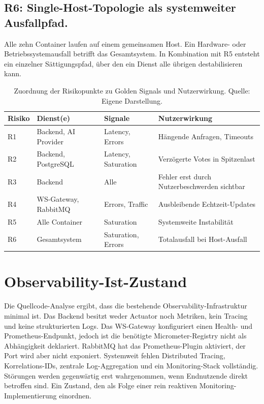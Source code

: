 \subsection{R6: Single-Host-Topologie als systemweiter Ausfallpfad.}
Alle zehn Container laufen auf einem gemeinsamen Host. Ein Hardware- oder Betriebssystemausfall betrifft das Gesamtsystem. In Kombination mit R5 entsteht ein einzelner Sättigungspfad, über den ein Dienst alle übrigen destabilisieren kann.

\begin{table}[ht]
\centering
\caption[Zuordnung der Risikopunkte zu Golden Signals und Nutzerwirkung.]{Zuordnung der Risikopunkte zu Golden Signals und Nutzerwirkung. \small Quelle: Eigene Darstellung.}
\label{tab:risiken}
\small
\begin{tabularx}{\textwidth}{l l l X}
\toprule
\textbf{Risiko} & \textbf{Dienst(e)} & \textbf{Signale} & \textbf{Nutzerwirkung} \\
\midrule
R1 & Backend, AI Provider & Latency, Errors & Hängende Anfragen, Timeouts \\
R2 & Backend, PostgreSQL & Latency, Saturation & Verzögerte Votes in Spitzenlast \\
R3 & Backend & Alle & Fehler erst durch Nutzerbeschwerden sichtbar \\
R4 & WS-Gateway, RabbitMQ & Errors, Traffic & Ausbleibende Echtzeit-Updates \\
R5 & Alle Container & Saturation & Systemweite Instabilität \\
R6 & Gesamtsystem & Saturation, Errors & Totalausfall bei Host-Ausfall \\
\bottomrule
\end{tabularx}
\end{table}


\section{Observability-Ist-Zustand}

Die Quellcode-Analyse ergibt, dass die bestehende Observability-Infrastruktur minimal ist. Das Backend besitzt weder Actuator noch Metriken, kein Tracing und keine strukturierten Logs. Das WS-Gateway konfiguriert einen Health- und Prometheus-Endpunkt, jedoch ist die benötigte Micrometer-Registry nicht als Abhängigkeit deklariert. RabbitMQ hat das Prometheus-Plugin aktiviert, der Port wird aber nicht exponiert. Systemweit fehlen Distributed Tracing, Korrelations-IDs, zentrale Log-Aggregation und ein Monitoring-Stack vollständig. Störungen werden gegenwärtig erst wahrgenommen, wenn Endnutzende direkt betroffen sind. Ein Zustand, den \textcite[S.~9--10]{Niedermaier2019onObservability} als Folge einer rein reaktiven Monitoring-Implementierung einordnen.


